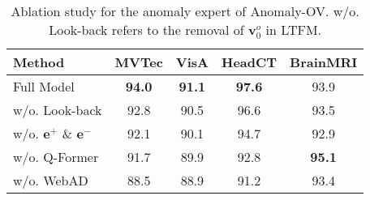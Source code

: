 \begin{table}[ht]
\small
\centering
\begin{tabular}{lcccc}
\toprule
Method             & MVTec & VisA & HeadCT & BrainMRI \\
\hline
Full Model         &  \textbf{94.0}     &  \textbf{91.1}    &   \textbf{97.6}     &   93.9       \\
\hline
w/o. Look-back      & 92.8      & 90.5     &  96.6      &   93.5      \\
w/o. $\mathbf{e}^{+}$ \&  $\mathbf{e}^{-}$    &  92.1     & 90.1     & 94.7       &  92.9       \\
w/o. Q-Former       & 91.7      & 89.9     & 92.8       &  \textbf{95.1}       \\
w/o. WebAD          & 88.5      & 88.9     & 91.2       &  93.4       \\
\bottomrule
\end{tabular}
\caption{Ablation study for the anomaly expert of Anomaly-OV. w/o. Look-back refers to the removal of $\mathbf{v}^{o}_{0}$ in LTFM.}
\label{tab:2}
\vspace{-4mm}
\end{table}
